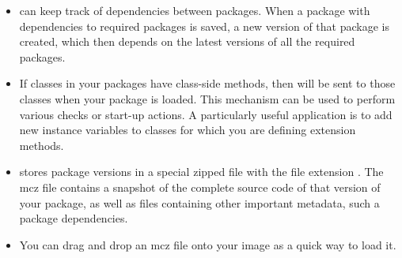 \documentclass[a4paper,10pt,twoside]{book}
\begin{document}
\begin{itemize}
\item \Mont can keep track of dependencies between packages. When a package with dependencies to required packages is saved, a new version of that package is created, which then depends on the latest versions of all the required packages.

\item If classes in your packages have class-side  methods, then  will be sent to those classes when your package is loaded. This mechanism can be used to perform various checks or start-up actions. A particularly useful application is to add new instance variables to classes for which you are defining extension methods.

\item \Mont stores package versions in a special zipped file with the file extension . The mcz file contains a snapshot of the complete source code of that version of your package, as well as files containing other important metadata, such a package dependencies.

\item You can drag and drop an mcz file onto your image as a quick way to load it.






\end{itemize}

\end{document}
